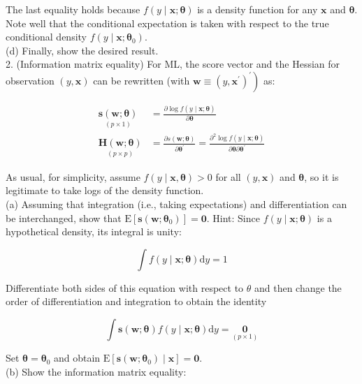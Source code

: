 \documentclass[10pt]{article}
\begin{document}
The last equality holds because $f(y \mid \mathbf{x} ; \boldsymbol{\theta})$ is a density function for any $\mathbf{x}$ and $\boldsymbol{\theta}$. Note well that the conditional expectation is taken with respect to the true conditional density $f\left(y \mid \mathbf{x} ; \boldsymbol{\theta}_{0}\right)$.\\
(d) Finally, show the desired result.\\
2. (Information matrix equality) For ML, the score vector and the Hessian for observation $(y, \mathbf{x})$ can be rewritten (with $\left.\mathbf{w} \equiv\left(y, \mathbf{x}^{\prime}\right)^{\prime}\right)$ as:

$$
\begin{aligned}
\underset{(p \times 1)}{\mathbf{s}(\mathbf{w} ; \boldsymbol{\theta})} & =\frac{\partial \log f(y \mid \mathbf{x} ; \boldsymbol{\theta})}{\partial \boldsymbol{\theta}} \\
\underset{(p \times p)}{\mathbf{H}(\mathbf{w} ; \boldsymbol{\theta})} & =\frac{\partial s(\mathbf{w} ; \boldsymbol{\theta})}{\partial \boldsymbol{\theta}^{\prime}}=\frac{\partial^{2} \log f(y \mid \mathbf{x} ; \boldsymbol{\theta})}{\partial \boldsymbol{\theta} \partial \boldsymbol{\theta}^{\prime}}
\end{aligned}
$$

As usual, for simplicity, assume $f(y \mid \mathbf{x}, \boldsymbol{\theta})>0$ for all $(y, \mathbf{x})$ and $\boldsymbol{\theta}$, so it is legitimate to take logs of the density function.\\
(a) Assuming that integration (i.e., taking expectations) and differentiation can be interchanged, show that $\mathrm{E}\left[\mathbf{s}\left(\mathbf{w} ; \boldsymbol{\theta}_{0}\right)\right]=\mathbf{0}$. Hint: Since $f(y \mid \mathbf{x} ; \boldsymbol{\theta})$ is a hypothetical density, its integral is unity:

$$
\int f(y \mid \mathbf{x} ; \boldsymbol{\theta}) \mathrm{d} y=1
$$

Differentiate both sides of this equation with respect to $\theta$ and then change the order of differentiation and integration to obtain the identity

$$
\int \mathbf{s}(\mathbf{w} ; \boldsymbol{\theta}) f(y \mid \mathbf{x} ; \boldsymbol{\theta}) \mathrm{d} y=\underset{(p \times 1)}{\mathbf{0}}
$$

Set $\boldsymbol{\theta}=\boldsymbol{\theta}_{0}$ and obtain $\mathrm{E}\left[\mathbf{s}\left(\mathbf{w} ; \boldsymbol{\theta}_{0}\right) \mid \mathbf{x}\right]=\mathbf{0}$.\\
(b) Show the information matrix equality:
\end{document}
